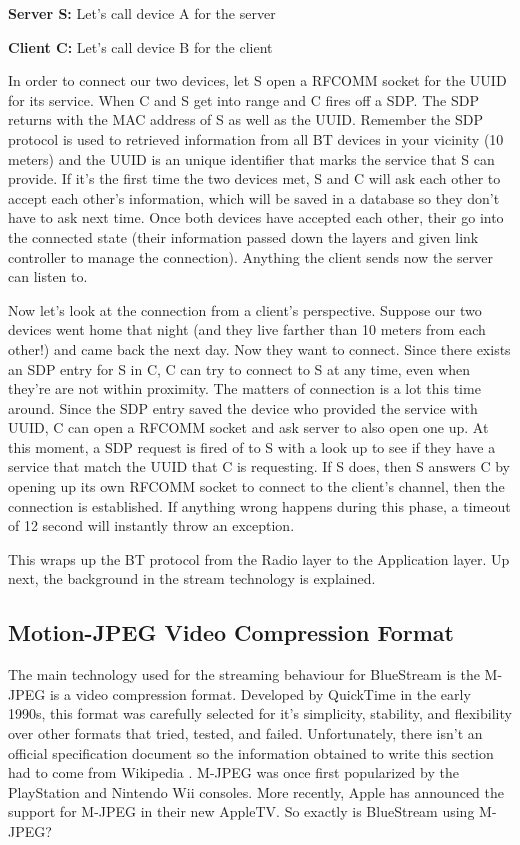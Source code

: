 \documentclass[a4paper,12pt]{article}
\begin{document}
\textbf{Server S: } Let’s call device A for the server

\textbf{Client C:} Let’s call device B for the client

In order to connect our two devices, let S open a RFCOMM socket for the UUID for its service. When C and S get into range and C fires off a SDP. The SDP returns with the MAC address of S as well as the UUID. Remember the SDP protocol is used to retrieved information from all BT devices in your vicinity (10 meters) and the UUID is an unique identifier that marks the service that S can provide. If it’s the first time the two devices met, S and C will ask each other to accept each other’s information, which will be saved in a database so they don’t have to ask next time. Once both devices have accepted each other, their go into the connected state (their information passed down the layers and given link controller to manage the connection). Anything the client sends now the server can listen to.

Now let’s look at the connection from a client’s perspective. Suppose our two devices went home that night (and they live farther than 10 meters from each other!) and came back the next day. Now they want to connect. Since there exists an SDP entry for S in C, C can try to connect to S at any time, even when they’re are not within proximity. The matters of connection is a lot this time around. Since the SDP entry saved the device who provided the service with UUID, C can open a RFCOMM socket and ask server to also open one up. At this moment, a SDP request is fired of to S with a look up to see if they have a service that match the UUID that C is requesting. If S does, then S answers C by opening up its own RFCOMM socket to connect to the client’s channel, then the connection is established. If anything wrong happens during this phase, a timeout of 12 second will instantly throw an exception. 

This wraps up the BT protocol from the Radio layer to the Application layer. Up next, the background in the stream technology is explained.

\subsection{Motion-JPEG Video Compression Format}
The main technology used for the streaming behaviour for BlueStream is the M-JPEG is a video compression format. Developed by QuickTime in the early 1990s, this format was carefully selected for it’s simplicity, stability, and flexibility over other formats that tried, tested, and failed. Unfortunately, there isn’t an official specification document so the information obtained to write this section had to come from Wikipedia \cite{MotionJPEG}. M-JPEG was once first popularized by the PlayStation and Nintendo Wii consoles. More recently, Apple has announced the support for M-JPEG in their new AppleTV. So exactly is BlueStream using M-JPEG?
\end{document}
